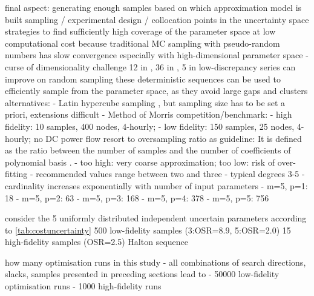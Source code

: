 
final aspect: generating enough samples based on which approximation model is built
sampling / experimental design / collocation points in the uncertainty space
strategies to find sufficiently high coverage of the parameter space at low computational cost \cite{fajraoui_optimal_2017,usher_value_2015}
because traditional MC sampling with pseudo-random numbers has slow convergence %
especially with high-dimensional parameter space - curse of dimensionality challenge
12 in \cite{trondle_trade-offs_2020}, 36 in \cite{pilpola_analyzing_2020}, 5 in \cite{shirizadeh_how_2019}
low-discrepancy series can improve on random sampling
these deterministic sequences can be used to efficiently sample from the parameter space, as they avoid large gaps and clusters \cite{fajraoui_optimal_2017}
alternatives:
- Latin hypercube sampling \cite{trondle_trade-offs_2020}, but sampling size has to be set a priori, extensions difficult \cite{fajraoui_optimal_2017}
- Method of Morris \cite{usher_value_2015,mavromatidis_uncertainty_2018}
competition/benchmark: \cite{trondle_trade-offs_2020}
- high fidelity: 10 samples, 400 nodes, 4-hourly;
- low fidelity: 150 samples, 25 nodes, 4-hourly; no DC power flow
resort to oversampling ratio as guideline:
It is defined as the ratio between the number of samples
and the number of coefficients of polynomial basis \cite{palar_multi-fidelity_2016}.
- too high: very coarse approximation; too low: risk of over-fitting \cite{palar_multi-fidelity_2016}
- recommended values range between two and three \cite{hosder2007,palar_multi-fidelity_2016,fajraoui_optimal_2017,gratiet_metamodel-based_2015}
- typical degrees 3-5 \cite{gratiet_metamodel-based_2015}
- cardinality increases exponentially with number of input parameters
  - m=5, p=1: 18
  - m=5, p=2: 63
  - m=5, p=3: 168
  - m=5, p=4: 378
  - m=5, p=5: 756


consider the 5 uniformly distributed independent uncertain parameters according to \cref{tab:costuncertainty}
500 low-fidelity samples (3:OSR=8.9, 5:OSR=2.0)
15 high-fidelity samples (OSR=2.5)
Halton sequence

how many optimisation runs in this study
- all combinations of search directions, slacks, samples presented in preceding sections lead to
- 50000 low-fidelity optimisation runs
- 1000 high-fidelity runs

